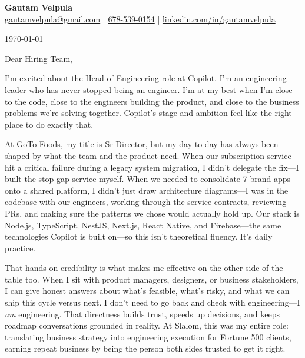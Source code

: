 \documentclass[11pt]{article}
\begin{document}
\begin{center}
    {\LARGE \textbf{Gautam Velpula}} \\[6pt]
    \href{mailto:gautamvelpula@gmail.com}{gautamvelpula@gmail.com} \;|\;
    \href{tel:6785390154}{678-539-0154} \;|\;
    \href{https://www.linkedin.com/in/gautamvelpula}{linkedin.com/in/gautamvelpula}
\end{center}

\vspace{14pt}

\today

\vspace{8pt}

Dear Hiring Team,

I'm excited about the Head of Engineering role at Copilot. I'm an engineering leader who has never stopped being an engineer. I'm at my best when I'm close to the code, close to the engineers building the product, and close to the business problems we're solving together. Copilot's stage and ambition feel like the right place to do exactly that.

At GoTo Foods, my title is Sr Director, but my day-to-day has always been shaped by what the team and the product need. When our subscription service hit a critical failure during a legacy system migration, I didn't delegate the fix---I built the stop-gap service myself. When we needed to consolidate 7 brand apps onto a shared platform, I didn't just draw architecture diagrams---I was in the codebase with our engineers, working through the service contracts, reviewing PRs, and making sure the patterns we chose would actually hold up. Our stack is Node.js, TypeScript, NestJS, Next.js, React Native, and Firebase---the same technologies Copilot is built on---so this isn't theoretical fluency. It's daily practice.

That hands-on credibility is what makes me effective on the other side of the table too. When I sit with product managers, designers, or business stakeholders, I can give honest answers about what's feasible, what's risky, and what we can ship this cycle versus next. I don't need to go back and check with engineering---I \textit{am} engineering. That directness builds trust, speeds up decisions, and keeps roadmap conversations grounded in reality. At Slalom, this was my entire role: translating business strategy into engineering execution for Fortune 500 clients, earning repeat business by being the person both sides trusted to get it right.
\end{document}
